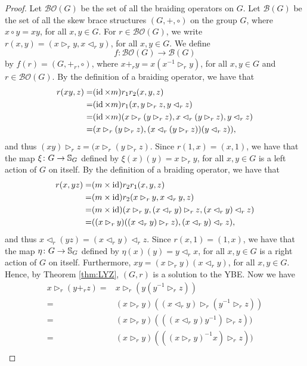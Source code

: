 \begin{proof}
    Let $\mathcal{BO}(G)$ be the set of all the braiding operators on $G$. Let $\mathcal{B}(G)$ be the set of all the skew brace structures $(G,+,\circ)$ on the group $G$, where $x\circ y=xy$, for all $x,y\in G$. For $r\in \mathcal{BO}(G)$, we write $r(x,y)=(x\rhd_r y,x\lhd_r y)$, for all $x,y\in G$. We define
    \[ f\colon \mathcal{BO}(G)\rightarrow \mathcal{B}(G)\]
    by $f(r)=(G,+_r,\circ)$, where $x+_r y=x(x^{-1}\rhd_r y)$, for all $x,y\in G$ and $r\in \mathcal{BO}(G)$. By the definition of a braiding operator, we have that
    \begin{align*}
        r(xy,z)=& (\operatorname{id}\times m)r_1r_2(x,y,z)\\
        =&(\operatorname{id}\times m)r_1(x,y\rhd_r z,y\lhd_r z)\\
        =&(\operatorname{id}\times m)(x\rhd_r (y\rhd_r z),x\lhd_r (y\rhd_r z),y\lhd_r z)\\
        =&(x\rhd_r (y\rhd_r z),(x\lhd_r (y\rhd_r z))(y\lhd_r z)),
        \end{align*}
    and thus $(xy)\rhd_r z=(x\rhd_r (y\rhd_r z)$. Since $r(1,x)=(x,1)$, we have that the map $\xi\colon G\rightarrow \mathbb{S}_G$ defined by $\xi(x)(y)=x\rhd_r y$, for all $x,y\in G$ is a left action of $G$ on itself.
    By the definition of a braiding operator, we have that
    \begin{align*}
        r(x,yz)=& (m\times\operatorname{id})r_2r_1(x,y,z)\\
        =&(m\times\operatorname{id})r_2(x\rhd_r y,x\lhd_r y,z)\\
        =&(m\times\operatorname{id})(x\rhd_r y,(x\lhd_r y)\rhd_r z, (x\lhd_r y)\lhd_r z)\\
        =&((x\rhd_r y)((x\lhd_r y)\rhd_r z), (x\lhd_r y)\lhd_r z),
        \end{align*}
    and thus $x\lhd_r (yz)=(x\lhd_r y)\lhd_r z$. Since $r(x,1)=(1,x)$, we have that the map $\eta\colon G\rightarrow \mathbb{S}_G$ defined by $\eta(x)(y)=y\lhd_r x$, for all $x,y\in G$ is a right action of $G$ on itself. Furthermore, $xy=(x\rhd_r y)(x\lhd_r y)$, for all $x,y\in G$. Hence, by Theorem \ref{thm:LYZ}, $(G,r)$ is a solution to the YBE. Now we have
    \begin{align}\label{LYZequa}
        x\rhd_r (y+_r z)=&x\rhd_r(y(y^{-1}\rhd_r z))\nonumber\\
        =&(x\rhd_r y)((x\lhd_r y)\rhd_r (y^{-1}\rhd_r z))\nonumber\\
        =&(x\rhd_r y)(((x\lhd_r y)y^{-1})\rhd_r z))\nonumber\\
        =&(x\rhd_r y)(((x\rhd_r y)^{-1}x)\rhd_r z))\nonumber\\

\end{align}
\end{proof}
